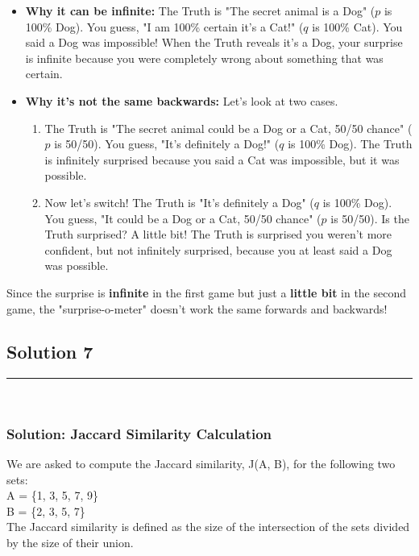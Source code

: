 \documentclass{article}
\begin{document}
\begin{itemize}
    \item \textbf{Why it can be infinite:} The Truth is "The secret animal is a Dog" ($p$ is 100\% Dog). You guess, "I am 100\% certain it's a Cat!" ($q$ is 100\% Cat). You said a Dog was impossible! When the Truth reveals it's a Dog, your surprise is infinite because you were completely wrong about something that was certain.
    
    \item \textbf{Why it's not the same backwards:} Let's look at two cases.
    \begin{enumerate}
        \item The Truth is "The secret animal could be a Dog or a Cat, 50/50 chance" ($p$ is 50/50). You guess, "It's definitely a Dog!" ($q$ is 100\% Dog). The Truth is infinitely surprised because you said a Cat was impossible, but it was possible.
        
        \item Now let's switch! The Truth is "It's definitely a Dog" ($q$ is 100\% Dog). You guess, "It could be a Dog or a Cat, 50/50 chance" ($p$ is 50/50). Is the Truth surprised? A little bit! The Truth is surprised you weren't more confident, but not infinitely surprised, because you at least said a Dog was possible.
    \end{enumerate}
\end{itemize}
Since the surprise is \textbf{infinite} in the first game but just a \textbf{little bit} in the second game, the "surprise-o-meter" doesn't work the same forwards and backwards! 


\newpage

\subsection*{Solution 7}
\noindent\rule{\textwidth}{0.4pt}\\

\subsubsection*{Solution: Jaccard Similarity Calculation}

\parbox{\textwidth}{
We are asked to compute the Jaccard similarity, J(A, B), for the following two sets:
\\
A = \{1, 3, 5, 7, 9\}
\\
B = \{2, 3, 5, 7\}
\\
The Jaccard similarity is defined as the size of the intersection of the sets divided by the size of their union.
}
\end{document}
